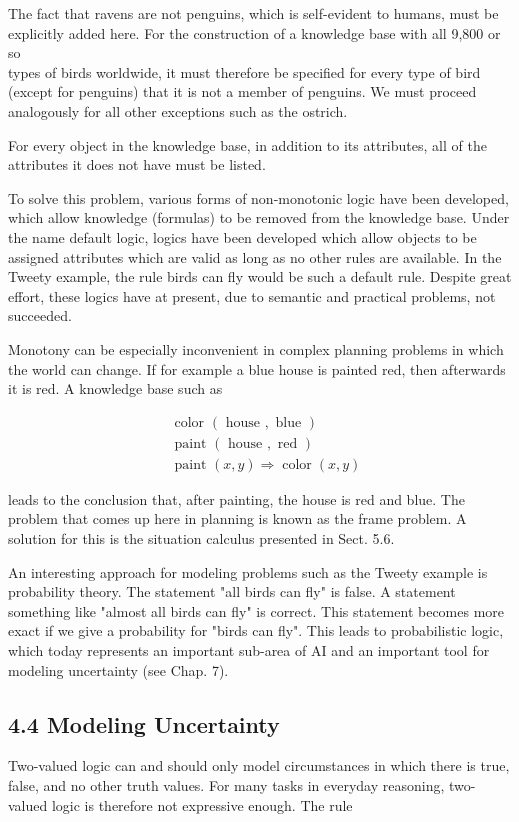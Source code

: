 \documentclass[10pt]{book}
\begin{document}
The fact that ravens are not penguins, which is self-evident to humans, must be explicitly added here. For the construction of a knowledge base with all 9,800 or so\\
types of birds worldwide, it must therefore be specified for every type of bird (except for penguins) that it is not a member of penguins. We must proceed analogously for all other exceptions such as the ostrich.

For every object in the knowledge base, in addition to its attributes, all of the attributes it does not have must be listed.

To solve this problem, various forms of non-monotonic logic have been developed, which allow knowledge (formulas) to be removed from the knowledge base. Under the name default logic, logics have been developed which allow objects to be assigned attributes which are valid as long as no other rules are available. In the Tweety example, the rule birds can fly would be such a default rule. Despite great effort, these logics have at present, due to semantic and practical problems, not succeeded.

Monotony can be especially inconvenient in complex planning problems in which the world can change. If for example a blue house is painted red, then afterwards it is red. A knowledge base such as

$$
\begin{aligned}
& \text { color }(\text { house }, \text { blue }) \\
& \text { paint }(\text { house }, \text { red }) \\
& \text { paint }(x, y) \Rightarrow \operatorname{color}(x, y)
\end{aligned}
$$

leads to the conclusion that, after painting, the house is red and blue. The problem that comes up here in planning is known as the frame problem. A solution for this is the situation calculus presented in Sect. 5.6.

An interesting approach for modeling problems such as the Tweety example is probability theory. The statement "all birds can fly" is false. A statement something like "almost all birds can fly" is correct. This statement becomes more exact if we give a probability for "birds can fly". This leads to probabilistic logic, which today represents an important sub-area of AI and an important tool for modeling uncertainty (see Chap. 7).

\subsection*{4.4 Modeling Uncertainty}
Two-valued logic can and should only model circumstances in which there is true, false, and no other truth values. For many tasks in everyday reasoning, two-valued logic is therefore not expressive enough. The rule
\end{document}
